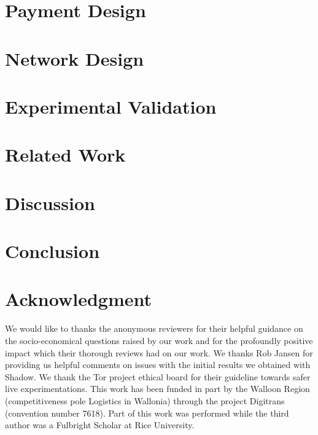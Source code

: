 \documentclass[USenglish,oneside,twocolumn]{article}
\begin{document}
\section{Payment Design}
\label{sec:payment}


\section{Network Design}
\label{sec:network}


\section{Experimental Validation}
\label{sec:experimentations}


\section{Related Work}
\label{sec:related_work}


\section{Discussion}

\label{sec:discussion}

\section{Conclusion}
\label{sec:conclusion}


\section*{Acknowledgment}

We would like to thanks the anonymous reviewers for their helpful
guidance on the socio-economical questions raised by our work and for
the profoundly positive impact which their thorough reviews had on our
work. We thanks Rob Jansen for providing us helpful comments on issues
with the initial results we obtained with Shadow. We thank the Tor
project ethical board for their guideline towards safer live
experimentations. This work has been funded in part by the Walloon
Region (competitiveness pole Logistics in Wallonia) through the
project Digitrans (convention number 7618). Part of this work was
performed while the third author was a Fulbright Scholar at Rice
University.
\end{document}
